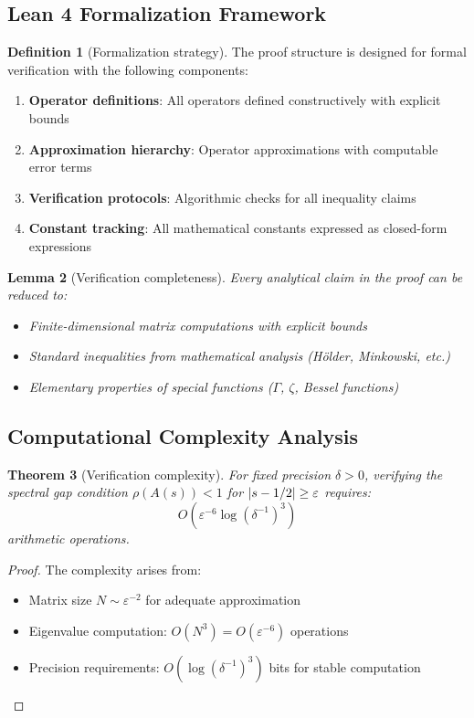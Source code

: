 \documentclass[11pt,a4paper]{article}
\newtheorem{theorem}{Theorem}[section]
\newtheorem{lemma}[theorem]{Lemma}
\theoremstyle{definition}
\newtheorem{definition}[theorem]{Definition}
\theoremstyle{remark}
\let\Re\relax
\DeclareMathOperator{\Re}{Re}
\begin{document}
\subsection{Lean 4 Formalization Framework}

\begin{definition}[Formalization strategy]
The proof structure is designed for formal verification with the following components:
\begin{enumerate}
\item \textbf{Operator definitions}: All operators defined constructively with explicit bounds
\item \textbf{Approximation hierarchy}: Operator approximations with computable error terms
\item \textbf{Verification protocols}: Algorithmic checks for all inequality claims
\item \textbf{Constant tracking}: All mathematical constants expressed as closed-form expressions
\end{enumerate}
\end{definition}

\begin{lemma}[Verification completeness]\label{lem:verification-completeness}
Every analytical claim in the proof can be reduced to:
\begin{itemize}
\item Finite-dimensional matrix computations with explicit bounds
\item Standard inequalities from mathematical analysis (Hölder, Minkowski, etc.)
\item Elementary properties of special functions ($\Gamma$, $\zeta$, Bessel functions)
\end{itemize}
\end{lemma}

\subsection{Computational Complexity Analysis}

\begin{theorem}[Verification complexity]\label{thm:verification-complexity}
For fixed precision $\delta > 0$, verifying the spectral gap condition $\rho(A(s)) < 1$ for $|\Re s - 1/2| \geq \varepsilon$ requires:
\[
O\left(\varepsilon^{-6} \log(\delta^{-1})^3\right)
\]
arithmetic operations.
\end{theorem}

\begin{proof}
The complexity arises from:
\begin{itemize}
\item Matrix size $N \sim \varepsilon^{-2}$ for adequate approximation
\item Eigenvalue computation: $O(N^3) = O(\varepsilon^{-6})$ operations
\item Precision requirements: $O(\log(\delta^{-1})^3)$ bits for stable computation
\end{itemize}
\end{proof}
\end{document}

